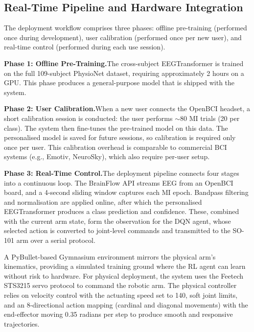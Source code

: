 \documentclass[12pt, a4paper]{article}
\begin{document}
\subsection{Real-Time Pipeline and Hardware Integration}

The deployment workflow comprises three phases: offline pre-training (performed once during development), user calibration (performed once per new user), and real-time control (performed during each use session).

\textbf{Phase 1: Offline Pre-Training.}\quad The cross-subject EEGTransformer is trained on the full 109-subject PhysioNet dataset, requiring approximately 2 hours on a GPU. This phase produces a general-purpose model that is shipped with the system.

\textbf{Phase 2: User Calibration.}\quad When a new user connects the OpenBCI headset, a short calibration session is conducted: the user performs $\sim$80 MI trials (20 per class). The system then fine-tunes the pre-trained model on this data. The personalised model is saved for future sessions, so calibration is required only once per user. This calibration overhead is comparable to commercial BCI systems (e.g., Emotiv, NeuroSky), which also require per-user setup.

\textbf{Phase 3: Real-Time Control.}\quad The deployment pipeline connects four stages into a continuous loop. The BrainFlow API streams EEG from an OpenBCI board, and a 4-second sliding window captures each MI epoch. Bandpass filtering and normalisation are applied online, after which the personalised EEGTransformer produces a class prediction and confidence. These, combined with the current arm state, form the observation for the DQN agent, whose selected action is converted to joint-level commands and transmitted to the SO-101 arm over a serial protocol.

A PyBullet-based Gymnasium environment mirrors the physical arm's kinematics, providing a simulated training ground where the RL agent can learn without risk to hardware. For physical deployment, the system uses the Feetech STS3215 servo protocol to command the robotic arm. The physical controller relies on velocity control with the actuating speed set to 140, soft joint limits, and an 8-directional action mapping (cardinal and diagonal movements) with the end-effector moving 0.35 radians per step to produce smooth and responsive trajectories.
\end{document}
